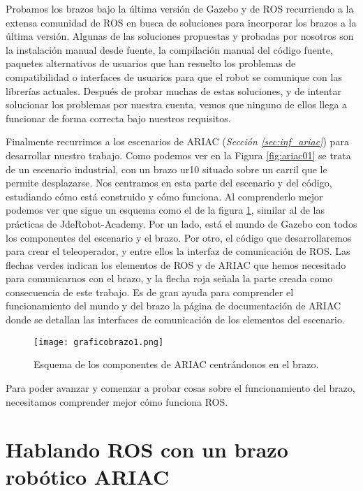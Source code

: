 Probamos los brazos bajo la última versión de Gazebo y de ROS recurriendo a la extensa comunidad de ROS en busca de soluciones para incorporar los brazos a la última versión. Algunas de las soluciones propuestas y probadas por nosotros son la instalación manual desde fuente, la compilación manual del código fuente, paquetes alternativos de usuarios que han resuelto los problemas de compatibilidad o interfaces de usuarios para que el robot se comunique con las librerías actuales. Después de probar muchas de estas soluciones, y de intentar solucionar los problemas por nuestra cuenta, vemos que ninguno de ellos llega a funcionar de forma correcta bajo nuestros requisitos.

Finalmente recurrimos a los escenarios de ARIAC (\textit{Sección \ref{sec:inf_ariac}}) para desarrollar nuestro trabajo. Como podemos ver en la Figura \ref{fig:ariac01} se trata de un escenario industrial, con un brazo ur10 situado sobre un carril que le permite desplazarse. Nos centramos en esta parte del escenario y del código, estudiando cómo está construido y cómo funciona. Al comprenderlo mejor podemos ver que sigue un esquema como el de la figura \ref{fig:graficobrazo}, similar al de las prácticas de JdeRobot-Academy. Por un lado, está el mundo de Gazebo con todos los componentes del escenario y el brazo. Por otro, el código que desarrollaremos para crear el teleoperador, y entre ellos la interfaz de comunicación de ROS. Las flechas verdes indican los elementos de ROS y de ARIAC que hemos necesitado para comunicarnos con el brazo, y la flecha roja señala la parte creada como consecuencia de este trabajo. Es de gran ayuda para comprender el funcionamiento del mundo y del brazo la página de documentación de ARIAC\cite{ariacwiki} donde se detallan las interfaces de comunicación de los elementos del escenario.

\begin{figure}[h]
	\centering\texttt{[image: graficobrazo1.png]}
	\caption{Esquema de los componentes de ARIAC centrándonos en el brazo.}
	\label{fig:graficobrazo}
\end{figure}

Para poder avanzar y comenzar a probar cosas sobre el funcionamiento del brazo, necesitamos comprender mejor cómo funciona ROS. 

\section{Hablando ROS con un brazo robótico ARIAC}
\label{sec:br_hablandoros}

